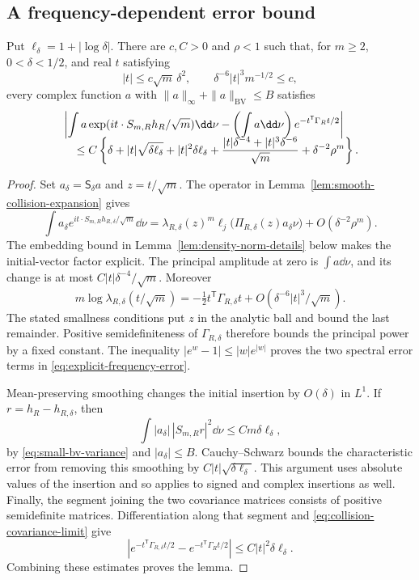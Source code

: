 \subsection{A frequency-dependent error bound}
\begin{lemma}
\label{lem:explicit-frequency-error}
Put $\ell_\delta=1+|\log\delta|$. There are $c,C>0$ and $\rho<1$
such that, for $m\ge2$, $0<\delta<1/2$, and real $t$ satisfying
\[
 |t|\le c\sqrt m\,\delta^2,\qquad
 \delta^{-6}|t|^3m^{-1/2}\le c,
\]
every complex function $a$ with
$\|a\|_\infty+\|a\|_{\mathrm{BV}}\le B$ satisfies
\begin{align}
 &\left|\int a\exp(it\cdot S_{m,R}h_R/\sqrt m)\dd\nu
       -\left(\int a\dd\nu\right)e^{-t^{\mathsf T}\Gamma_Rt/2}\right|
       \notag\\[-2mm]
 &\quad\le C\left\{
 \delta+|t|\sqrt{\delta\ell_\delta}+|t|^2\delta\ell_\delta
 +\frac{|t|\delta^{-4}+|t|^3\delta^{-6}}{\sqrt m}
 +\delta^{-2}\rho^m\right\}.\label{eq:explicit-frequency-error}
\end{align}
\end{lemma}
\begin{proof}
Set $a_\delta=\mathsf S_\delta a$ and $z=t/\sqrt m$.
The operator in Lemma~\ref{lem:smooth-collision-expansion} gives
\[
 \int a_\delta e^{it\cdot S_{m,R}h_{R,\delta}/\sqrt m}\dd\nu
 =\lambda_{R,\delta}(z)^m
   \ell_j\bigl(\Pi_{R,\delta}(z)a_\delta\nu\bigr)
       +O(\delta^{-2}\rho^m).
\]
The embedding bound in Lemma~\ref{lem:density-norm-details} below
makes the initial-vector factor explicit. The principal amplitude
at zero is $\int a\dd\nu$, and its change is at most
$C|t|\delta^{-4}/\sqrt m$. Moreover
\[
 m\log\lambda_{R,\delta}(t/\sqrt m)
 =-\tfrac12t^{\mathsf T}\Gamma_{R,\delta}t
       +O(\delta^{-6}|t|^3/\sqrt m).
\]
The stated smallness conditions put $z$ in the analytic ball and bound
the last remainder. Positive semidefiniteness of
$\Gamma_{R,\delta}$ therefore bounds the principal power by a fixed
constant. The inequality $|e^w-1|\le |w|e^{|w|}$ proves the two
spectral error terms in \eqref{eq:explicit-frequency-error}.

Mean-preserving smoothing changes the initial insertion by $O(\delta)$
in $L^1$. If $r=h_R-h_{R,\delta}$, then
\[
 \int |a_\delta|\,|S_{m,R}r|^2\dd\nu
       \le C m\delta\ell_\delta,
\]
by \eqref{eq:small-bv-variance} and $|a_\delta|\le B$.
Cauchy--Schwarz bounds the characteristic error from removing this
smoothing by $C|t|\sqrt{\delta\ell_\delta}$. This argument uses
absolute values of the insertion and so applies to signed and complex
insertions as well. Finally, the segment joining the two covariance
matrices consists of positive semidefinite matrices. Differentiation
along that segment and \eqref{eq:collision-covariance-limit} give
\[
 \left|e^{-t^{\mathsf T}\Gamma_{R,\delta}t/2}
             -e^{-t^{\mathsf T}\Gamma_Rt/2}\right|
       \le C|t|^2\delta\ell_\delta.
\]
Combining these estimates proves the lemma.
\end{proof}

